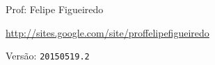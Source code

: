 \documentclass[a4paper]{article}
\begin{document}
\parbox[c]{.825\textwidth}{\raggedright%
{Prof: Felipe Figueiredo\par}
{\url{http://sites.google.com/site/proffelipefigueiredo}\par}
}

Versão: \verb|20150519.2|



\section{}
\section{}
\end{document}

